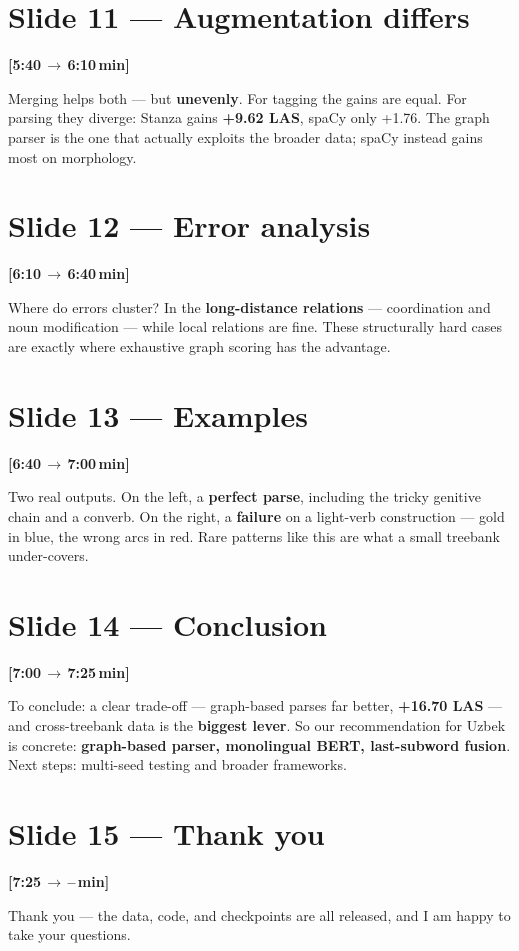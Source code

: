 \documentclass[12pt,a4paper]{article}
\newcommand{\timing}[2]{%
   \par\noindent\textbf{\small [#1\,$\to$\,#2\,min]}\par\vspace{0.15em}}
\newcommand{\say}[1]{\textbf{#1}}
\begin{document}
\section*{Slide 11 --- Augmentation differs}
\timing{5:40}{6:10}
Merging helps both --- but \say{unevenly}. For tagging the gains are
equal. For parsing they diverge: Stanza gains \say{+9.62 LAS}, spaCy only
+1.76. The graph parser is the one that actually exploits the broader
data; spaCy instead gains most on morphology.

\section*{Slide 12 --- Error analysis}
\timing{6:10}{6:40}
Where do errors cluster? In the \say{long-distance relations} ---
coordination and noun modification --- while local relations are fine.
These structurally hard cases are exactly where exhaustive graph scoring
has the advantage.

\section*{Slide 13 --- Examples}
\timing{6:40}{7:00}
Two real outputs. On the left, a \say{perfect parse}, including the tricky
genitive chain and a converb. On the right, a \say{failure} on a
light-verb construction --- gold in blue, the wrong arcs in red. Rare
patterns like this are what a small treebank under-covers.

\section*{Slide 14 --- Conclusion}
\timing{7:00}{7:25}
To conclude: a clear trade-off --- graph-based parses far better,
\say{+16.70 LAS} --- and cross-treebank data is the \say{biggest lever}.
So our recommendation for Uzbek is concrete: \say{graph-based parser,
monolingual BERT, last-subword fusion}. Next steps: multi-seed testing
and broader frameworks.

\section*{Slide 15 --- Thank you}
\timing{7:25}{--}
Thank you --- the data, code, and checkpoints are all released, and I am
happy to take your questions.
\end{document}

